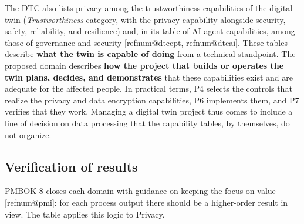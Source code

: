 \documentclass[11pt,a4paper]{article}
\makeatletter
\newcommand{\refnum}[1]{\csname refnum@#1\endcsname}
\makeatother
\begin{document}
The DTC also lists privacy among the trustworthiness capabilities of the digital twin (\textit{Trustworthiness} category, with the privacy capability alongside security, safety, reliability, and resilience) and, in its table of AI agent capabilities, among those of governance and security [\refnum{dtccpt}, \refnum{dtcai}]. These tables describe \textbf{what the twin is capable of doing} from a technical standpoint. The proposed domain describes \textbf{how the project that builds or operates the twin plans, decides, and demonstrates} that these capabilities exist and are adequate for the affected people. In practical terms, P4 selects the controls that realize the privacy and data encryption capabilities, P6 implements them, and P7 verifies that they work. Managing a digital twin project thus comes to include a line of decision on data processing that the capability tables, by themselves, do not organize.
\subsection{Verification of results}

PMBOK 8 closes each domain with guidance on keeping the focus on value [\refnum{pmi}]: for each process output there should be a higher-order result in view. The table applies this logic to Privacy.
\end{document}
